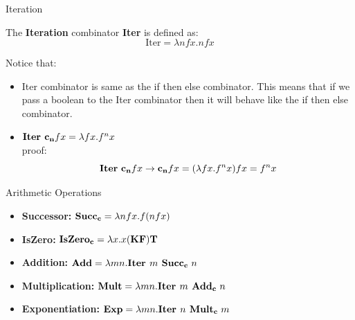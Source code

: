 \documentclass{beamer}
\begin{document}
\begin{frame}{Iteration}

  \begin{definition}
    The \textbf{Iteration} combinator \textbf{Iter} is defined as:
    \[
      \text{Iter} = \lambda n f x. n f x
    \]
  \end{definition}
  Notice that:
  \begin{itemize}
    \item Iter combinator is same as the if then else combinator. This means that if we pass a boolean to the Iter combinator then it will behave like the if then else combinator.
    \item \(\text{\textbf{Iter }} \mathbf{c_n} f x = \lambda fx. f^n x\) \\
    proof:
    \[
      \text{\textbf{Iter} } \mathbf{c_n} f x \rightarrow \mathbf{c_n} f x = (\lambda fx.f^n x)fx = f^n x
    \]

  \end{itemize}
\end{frame}

\begin{frame}{Arithmetic Operations}
  \begin{itemize}
    \item \textbf{Successor:} 
    \(\text{\textbf{Succ}}_\text{\textbf{c}} = \lambda nfx.f(nfx)\)
    \item \textbf{IsZero:} 
    \(\text{\textbf{IsZero}}_\text{\textbf{c}} = \lambda x. x(\mathbf{K}\mathbf{F})\mathbf{T}\)
    \item \textbf{Addition:}
    \(\text{\textbf{Add}} = \lambda mn.\text{\textbf{Iter }} m \text{\textbf{ Succ}}_\text{\textbf{c }}n \)
    \item \textbf{Multiplication:}
    \(\text{\textbf{Mult}} = \lambda mn.\text{\textbf{Iter }} m \text{\textbf{ Add}}_\text{\textbf{c }}n\)
    \item \textbf{Exponentiation:}
    \(\text{\textbf{Exp}} = \lambda mn.\text{\textbf{Iter }} n \text{\textbf{ Mult}}_\text{\textbf{c }}m\)
  \end{itemize}
\end{frame}
\end{document}
